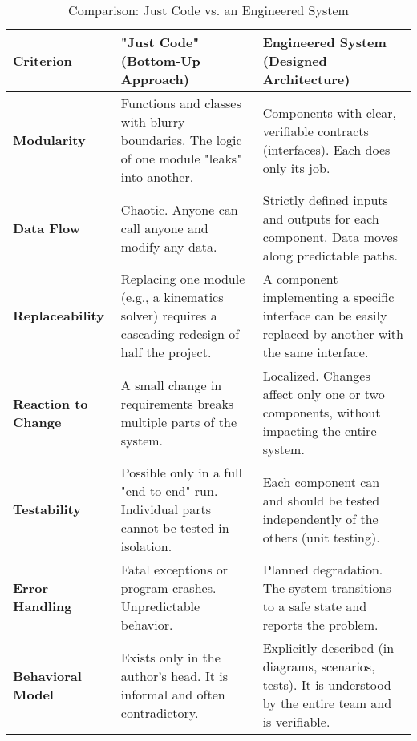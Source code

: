 \begin{table}[h!]
    \caption{Comparison: Just Code vs. an Engineered System}
    \label{tab:code_vs_system}
    \centering
    \renewcommand{\arraystretch}{1.2}
    \begin{tabular}{p{} p{} p{}}
        \toprule %
        \textbf{Criterion} & \textbf{"Just Code" (Bottom-Up Approach)} & \textbf{Engineered System (Designed Architecture)} \\
        \toprule 
        \textbf{Modularity} & Functions and classes with blurry boundaries. The logic of one module "leaks" into another. & Components with clear, verifiable contracts (interfaces). Each does only its job. \\
        \midrule %
        \textbf{Data Flow} & Chaotic. Anyone can call anyone and modify any data. & Strictly defined inputs and outputs for each component. Data moves along predictable paths. \\
        \midrule %
        \textbf{Replaceability} & Replacing one module (e.g., a kinematics solver) requires a cascading redesign of half the project. & A component implementing a specific interface can be easily replaced by another with the same interface. \\
        \midrule %
        \textbf{Reaction to Change} & A small change in requirements breaks multiple parts of the system. & Localized. Changes affect only one or two components, without impacting the entire system. \\
        \midrule %
        \textbf{Testability} & Possible only in a full "end-to-end" run. Individual parts cannot be tested in isolation. & Each component can and should be tested independently of the others (unit testing). \\
        \midrule %
        \textbf{Error Handling} & Fatal exceptions or program crashes. Unpredictable behavior. & Planned degradation. The system transitions to a safe state and reports the problem. \\
        \midrule %
        \textbf{Behavioral Model} & Exists only in the author's head. It is informal and often contradictory. & Explicitly described (in diagrams, scenarios, tests). It is understood by the entire team and is verifiable. \\
        \bottomrule %
    \end{tabular}
\end{table}


